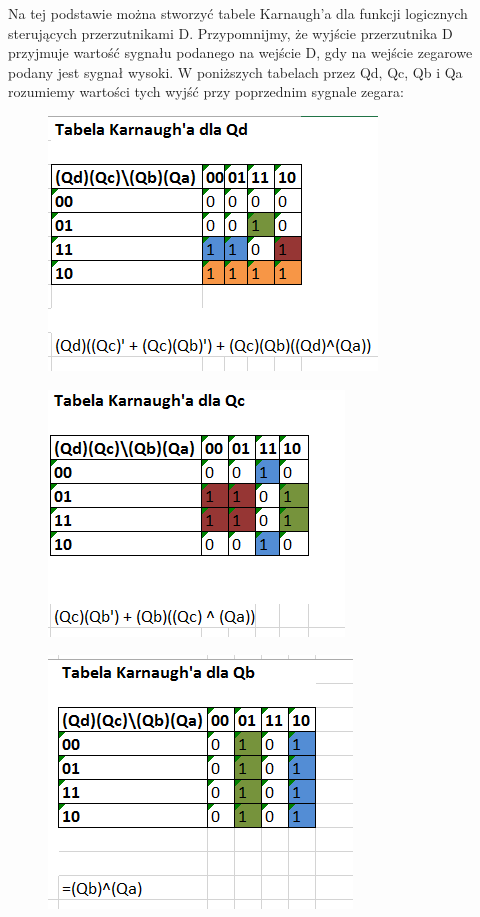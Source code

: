 \documentclass[12pt,a4paper]{article}
\begin{document}
Na tej podstawie można stworzyć tabele Karnaugh'a dla funkcji logicznych sterujących przerzutnikami D.
Przypomnijmy, że wyjście przerzutnika D przyjmuje wartość sygnału podanego na wejście D, gdy na wejście zegarowe podany jest sygnał wysoki.
W poniższych tabelach przez Qd, Qc, Qb i Qa rozumiemy wartości tych wyjść przy poprzednim sygnale zegara:

\begin{figure}[H]
\centering
\includegraphics{img/4c_table_4bit_qd}
\end{figure}

\begin{figure}[H]
\centering
\includegraphics{img/4c_table_4bit_qc}
\end{figure}

\begin{figure}[H]
\centering
\includegraphics{img/4c_table_4bit_qb}
\end{figure}
\end{document}
